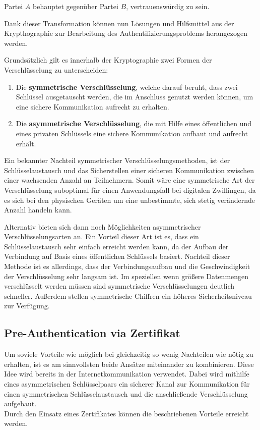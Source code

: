 \begin{problem}[Authentifizierung]
    Partei $A$ behauptet gegenüber Partei $B$, vertrauenswürdig zu sein.
\end{problem}

Dank dieser Transformation können nun Lösungen und Hilfsmittel aus der Krypthographie zur Bearbeitung des Authentifizierungsproblems herangezogen werden.

Grundsätzlich gilt es innerhalb der Kryptographie zwei Formen der Verschlüsselung zu unterscheiden:

\begin{enumerate}
    \item Die \textbf{symmetrische Verschlüsselung}, welche darauf beruht, dass zwei Schlüssel ausgetauscht werden, die im Anschluss genutzt werden können, um eine sichere Kommunikation aufrecht zu erhalten.
    \item  Die \textbf{asymmetrische Verschlüsselung}, die mit Hilfe eines öffentlichen und eines privaten Schlüssels eine sichere Kommunikation aufbaut und aufrecht erhält.
\end{enumerate}

Ein bekannter Nachteil symmetrischer Verschlüsselungsmethoden, ist der Schlüsselaustausch und das Sicherstellen einer sicheren Kommunikation zwischen einer wachsenden Anzahl an Teilnehmern. Somit wäre eine symmetrische Art der Verschlüsselung suboptimal für einen Anwendungsfall bei digitalen Zwillingen, da es sich bei den physischen Geräten um eine unbestimmte, sich stetig verändernde Anzahl handeln kann.

Alternativ bieten sich dann noch Möglichkeiten asymmetrischer Verschlüsselungsarten an. Ein Vorteil dieser Art ist es, dass ein Schlüsselaustausch sehr einfach erreicht werden kann, da der Aufbau der Verbindung auf Basis eines öffentlichen Schlüssels basiert. Nachteil dieser Methode ist es allerdings, dass der Verbindungsaufbau und die Geschwindigkeit der Verschlüsselung sehr langsam ist. Im speziellen wenn größere Datenmengen verschlüsselt werden müssen sind symmetrische Verschlüsselungen deutlich schneller. Außerdem stellen symmetrische Chiffren ein höheres Sicherheitsniveau zur Verfügung.

\subsection{Pre-Authentication via Zertifikat}
\label{sec:certificate}

Um soviele Vorteile wie möglich bei gleichzeitig so wenig Nachteilen wie nötig zu erhalten, ist es am sinnvollsten beide Ansätze miteinander zu kombinieren. Diese Idee wird bereits in der Internetkommunikation verwendet. Dabei wird mithilfe eines asymmetrischen Schlüsselpaars ein sicherer Kanal zur Kommunikation für einen symmetrischen Schlüsselaustausch und die anschließende Verschlüsselung aufgebaut. \\
Durch den Einsatz eines Zertifikates können die beschriebenen Vorteile erreicht werden.

